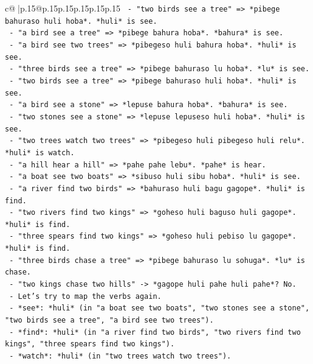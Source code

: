 \documentclass{article}
\begin{document}
{\begin{supertabular}{c@{$\;$}|p{.15\linewidth}@{}p{.15\linewidth}p{.15\linewidth}p{.15\linewidth}p{.15\linewidth}p{.15\linewidth}}
{{{\texttt{              {-} "two birds see a tree" => *pibege bahuraso huli hoba*. *huli* is see.} \\
\texttt{              {-} "a bird see a tree" => *pibege bahura hoba*. *bahura* is see.} \\
\texttt{              {-} "a bird see two trees" => *pibegeso huli bahura hoba*. *huli* is see.} \\
\texttt{              {-} "three birds see a tree" => *pibege bahuraso lu hoba*. *lu* is see.} \\
\texttt{              {-} "two birds see a tree" => *pibege bahuraso huli hoba*. *huli* is see.} \\
\texttt{              {-} "a bird see a stone" => *lepuse bahura hoba*. *bahura* is see.} \\
\texttt{              {-} "two stones see a stone" => *lepuse lepuseso huli hoba*. *huli* is see.} \\
\texttt{              {-} "two trees watch two trees" => *pibegeso huli pibegeso huli relu*. *huli* is watch.} \\
\texttt{              {-} "a hill hear a hill" => *pahe pahe lebu*. *pahe* is hear.} \\
\texttt{              {-} "a boat see two boats" => *sibuso huli sibu hoba*. *huli* is see.} \\
\texttt{              {-} "a river find two birds" => *bahuraso huli bagu gagope*. *huli* is find.} \\
\texttt{              {-} "two rivers find two kings" => *goheso huli baguso huli gagope*. *huli* is find.} \\
\texttt{              {-} "three spears find two kings" => *goheso huli pebiso lu gagope*. *huli* is find.} \\
\texttt{              {-} "three birds chase a tree" => *pibege bahuraso lu sohuga*. *lu* is chase.} \\
\texttt{              {-} "two kings chase two hills" {-}> *gagope huli pahe huli pahe*? No.} \\
\texttt{              {-} Let's try to map the verbs again.} \\
\texttt{                {-} *see*: *huli* (in "a boat see two boats", "two stones see a stone", "two birds see a tree", "a bird see two trees").} \\
\texttt{                {-} *find*: *huli* (in "a river find two birds", "two rivers find two kings", "three spears find two kings").} \\
\texttt{                {-} *watch*: *huli* (in "two trees watch two trees").} \\
}}}
\end{supertabular}}
\end{document}
